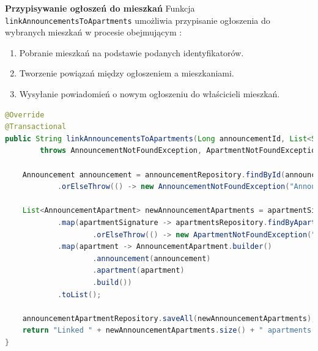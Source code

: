 \noindent \textbf{Przypisywanie ogłoszeń do mieszkań}\newline
Funkcja \texttt{linkAnnouncementsToApartments} umożliwia przypisanie ogłoszenia do wybranych mieszkań w procesie obejmującym	:
\begin{enumerate}
    \item Pobranie mieszkań na podstawie podanych identyfikatorów.
    \item Tworzenie powiązań między ogłoszeniem a mieszkaniami.
    \item Wysyłanie powiadomień o nowym ogłoszeniu do właścicieli mieszkań.
\end{enumerate}


\begin{lstlisting}[language=Java, style=JavaStyle, caption=Przypisywanie ogłoszeń do mieszkań.]
@Override
@Transactional
public String linkAnnouncementsToApartments(Long announcementId, List<String> apartmentSignatures) 
        throws AnnouncementNotFoundException, ApartmentNotFoundException {

    Announcement announcement = announcementRepository.findById(announcementId)
            .orElseThrow(() -> new AnnouncementNotFoundException("Announcement: " + announcementId + " not found"));

    List<AnnouncementApartment> newAnnouncementApartments = apartmentSignatures.stream()
            .map(apartmentSignature -> apartmentsRepository.findByApartmentSignature(apartmentSignature)
                    .orElseThrow(() -> new ApartmentNotFoundException("Apartment: " + apartmentSignature + " not found")))
            .map(apartment -> AnnouncementApartment.builder()
                    .announcement(announcement)
                    .apartment(apartment)
                    .build())
            .toList();

    announcementApartmentRepository.saveAll(newAnnouncementApartments);
    return "Linked " + newAnnouncementApartments.size() + " apartments to announcement: " + announcementId;
}
\end{lstlisting}

